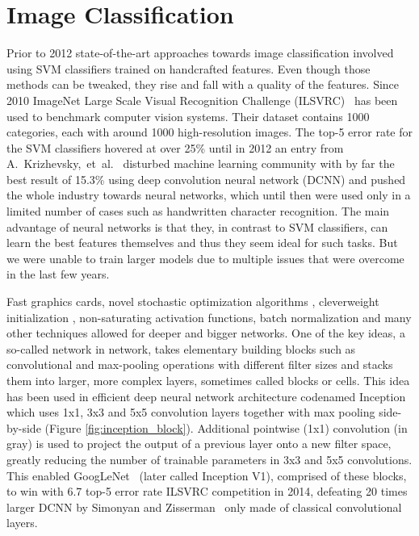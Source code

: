 \section{Image Classification}
Prior to 2012 state-of-the-art approaches towards image classification involved using SVM classifiers trained on handcrafted features. Even though those methods can be tweaked, they rise and fall with a quality of the features. Since 2010 ImageNet Large Scale Visual Recognition Challenge (ILSVRC)~\cite{ILSVRC15} has been used to benchmark computer vision systems. Their dataset contains 1000 categories, each with around 1000 high-resolution images. The top-5 error rate for the SVM classifiers hovered at over 25\% until in 2012 an entry from A.~Krizhevsky,~et~al.~\cite{AlexNet} disturbed machine learning community with by far the best result of 15.3\% using deep convolution neural network (DCNN) and pushed the whole industry towards neural networks, which until then were used only in a limited number of cases such as handwritten character recognition. The main advantage of neural networks is that they, in contrast to SVM classifiers, can learn the best features themselves and thus they seem ideal for such tasks. But we were unable to train larger models due to multiple issues that were overcome in the last few years.

Fast graphics cards, novel stochastic optimization algorithms \cite{kingma2014adam}, clever\linebreak[5] weight initialization \cite{glorot2010understanding}, non-saturating activation functions, batch normalization \cite{ioffe2015batch} and many other techniques allowed for deeper and bigger networks. One of the key ideas, a so-called network in network, takes elementary building blocks such as convolutional and max-pooling operations with different filter sizes and stacks them into larger, more complex layers, sometimes called blocks or cells. This idea has been used in efficient deep neural network architecture codenamed Inception~\cite{szegedy2015going} which uses 1x1, 3x3 and 5x5 convolution layers together with max pooling side-by-side (Figure \ref{fig:inception_block}). Additional pointwise (1x1) convolution (in gray) is used to project the output of a previous layer onto a new filter space, greatly reducing the number of trainable parameters in 3x3 and 5x5 convolutions. This enabled GoogLeNet~\cite{szegedy2015going} (later called Inception V1), comprised of these blocks, to win with 6.7 top-5 error rate ILSVRC competition in 2014, defeating 20 times larger DCNN by Simonyan and Zisserman~\cite{simonyan2014very} only made of classical convolutional layers.

